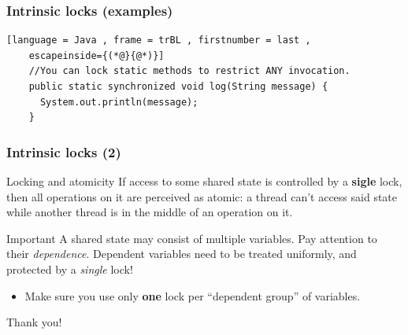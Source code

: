 \documentclass[xcolor={dvipsnames,svgnames},aspectratio=169]{beamer}
\begin{document}
\begin{frame}[fragile]
  \frametitle{Intrinsic locks (examples)}

  \begin{lstlisting}[language = Java , frame = trBL , firstnumber = last ,
    escapeinside={(*@}{@*)}]
    //You can lock static methods to restrict ANY invocation.
    public static synchronized void log(String message) {
      System.out.println(message);
    }
  \end{lstlisting}

\end{frame}

\begin{frame}[fragile]
  \frametitle{Intrinsic locks (2)}
  \begin{block}{Locking and atomicity}
    If access to some shared state is controlled by a \textbf{sigle} lock, then
    all operations on it are perceived as atomic: a thread can't access said
    state while another thread is in the middle of an operation on it.
  \end{block}

  \begin{block}{Important}
    A shared state may consist of multiple variables. Pay attention to their
    \emph{dependence}. Dependent variables need to be treated uniformly, and
    protected by a \emph{single} lock!
  \end{block}

  \begin{itemize}
  \item<2->[\faUserInjured] Make sure you use only \textbf{one} lock per
    ``dependent group'' of variables.
  \end{itemize}
\end{frame}

\begin{frame}{}
  \centering \huge
  Thank you!
\end{frame}
\end{document}
